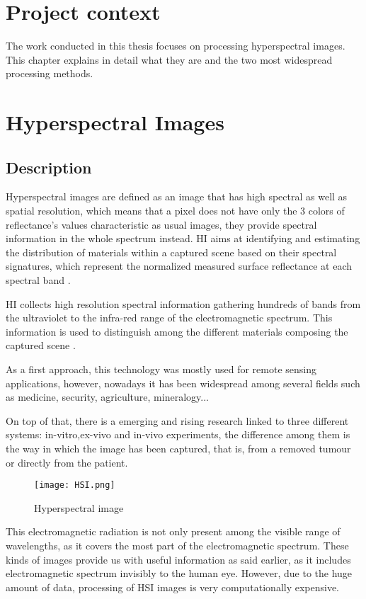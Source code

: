 \section{Project context} 
    The work conducted in this thesis focuses on processing hyperspectral images. This chapter explains in detail what they are and the two most widespread processing methods. 
\section{Hyperspectral Images}
     \subsection{Description}
   Hyperspectral images are defined as an image that has high spectral as well as spatial resolution, which means that a pixel does not have only the 3 colors of reflectance's values characteristic as usual images, they provide spectral information in the whole spectrum instead. HI aims at identifying and estimating the distribution of materials within a captured scene based on their spectral signatures, which represent the normalized measured surface reflectance at each spectral band \cite{manolakis2002detection}.
   
   HI collects high resolution spectral information gathering hundreds of bands from the ultraviolet to the infra-red range of the electromagnetic spectrum. This information is used to distinguish among the different materials composing the captured scene \cite{lee1987synchronous}.
   
   As a first approach, this technology was mostly used for remote sensing applications, however, nowadays it has been widespread among several fields such as medicine, security, agriculture, mineralogy...
   
    On top of that, there is a emerging and rising research linked to three different systems: in-vitro,ex-vivo and in-vivo experiments, the difference among them is the way in which the image has been captured, that is, from a removed tumour or directly from the patient.

    
     \begin{figure}[H]
        \texttt{[image: HSI.png]}        
        \centering    
        \caption{Hyperspectral image}
        \label{fig:systemArch}
    \end{figure}
       
  
    
  This electromagnetic radiation is not only present among the visible range of wavelengths, as it covers the most part of the electromagnetic spectrum. These kinds of images provide us with useful information as said earlier, as it includes electromagnetic spectrum invisibly to the human eye. However, due to the huge amount of data, processing of HSI images is very computationally expensive.
  
